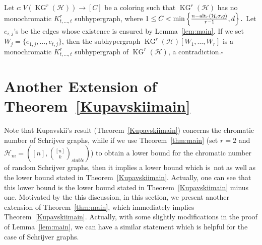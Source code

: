 \documentclass[11pt]{amsart}
\theoremstyle{definition}
\theoremstyle{remark}
\def\KG{\operatorname{KG}}
\def\HH{\mathcal{H}}
\begin{document}
Let $c:V(\KG^r(\mathcal{H}))\longrightarrow [C]$ be a coloring such that 
$\KG^r(\mathcal{H})$ has no monochromatic $K_{t,\ldots,t}^r$ subhypergraph, where  
$1\leq C<\min\left\{{n-{\rm alt}_r(\mathcal{H},\sigma,q)\over r-1},d\right\}.$
Let $e_{i,j}$'s be the edges whose existence is ensured by Lemma~\ref{lem:main}.
If we set $W_j=\{e_{1,j},\ldots,e_{t,j}\}$, then the subhypergraph 
$\KG^r(\mathcal{H})[W_1,\ldots,W_r]$ is a monochromatic $K^r_{t,\ldots,t}$ 
subhypergraph of $\KG^r(\mathcal{H})$, a contradiction.\hfill$\square$\\


\section{Another Extension of Theorem~\ref{Kupavskiimain}\label{SG}}
Note that Kupavskii's result (Theorem~\ref{Kupavskiimain}) concerns the 
chromatic number of Schrijver graphs, while if we use Theorem~\ref{thm:main} 
(set $r=2$ and $\HH_m=([n],{[n]\choose k}_{stable})$)  to obtain a lower bound 
for the chromatic number of random Schrijver graphs, then it implies 
a lower bound which is~not as well as the lower bound stated in 
Theorem~\ref{Kupavskiimain}. Actually, one can see that this lower bound  
is the lower bound stated in Theorem~\ref{Kupavskiimain} minus one. 
Motivated by the this discussion, 
in this section, we present another extension of Theorem~\ref{thm:main}, 
which immediately  implies Theorem~\ref{Kupavskiimain}.  
Actually, with some slightly modifications in the proof of Lemma~\ref{lem:main}, 
we can have a similar statement which is helpful for the case of Schrijver graphs. 
\end{document}
